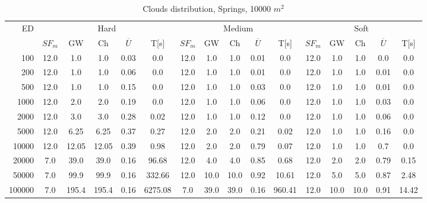 \begin{table}[htb]
	\centering
	\footnotesize
	\begin{tabular}{|r|c|c|c|c|c|c|c|c|c|c|c|c|c|c|c|} 
		\hline
		\multirow{2}{*}{ED} & \multicolumn{5}{c|}{Hard} & \multicolumn{5}{c|}{Medium} &\multicolumn{5}{c|}{Soft} \\ 
		\cline{2-16} 
		&$SF_{m}$&GW & Ch & $\overline{U}$&T[s] &$SF_{m}$&GW & Ch & $\overline{U}$ &T[s] &$SF_{m}$&GW & Ch & $\overline{U}$  & T[s]  \\ 
		\hline 
		100 & 12.0 & 1.0 & 1.0 & 0.03 & 0.0 & 12.0 & 1.0 & 1.0 & 0.01 & 0.0 & 12.0 & 1.0 & 1.0 & 0.0 & 0.0\\ 
		200 & 12.0 & 1.0 & 1.0 & 0.06 & 0.0 & 12.0 & 1.0 & 1.0 & 0.01 & 0.0 & 12.0 & 1.0 & 1.0 & 0.01 & 0.0\\ 
		500 & 12.0 & 1.0 & 1.0 & 0.15 & 0.0 & 12.0 & 1.0 & 1.0 & 0.03 & 0.0 & 12.0 & 1.0 & 1.0 & 0.01 & 0.0\\ 
		1000 & 12.0 & 2.0 & 2.0 & 0.19 & 0.0 & 12.0 & 1.0 & 1.0 & 0.06 & 0.0 & 12.0 & 1.0 & 1.0 & 0.03 & 0.0\\ 
		2000 & 12.0 & 3.0 & 3.0 & 0.28 & 0.02 & 12.0 & 1.0 & 1.0 & 0.12 & 0.0 & 12.0 & 1.0 & 1.0 & 0.06 & 0.0\\ 
		5000 & 12.0 & 6.25 & 6.25 & 0.37 & 0.27 & 12.0 & 2.0 & 2.0 & 0.21 & 0.02 & 12.0 & 1.0 & 1.0 & 0.16 & 0.0\\ 
		10000 & 12.0 & 12.05 & 12.05 & 0.39 & 0.98 & 12.0 & 2.0 & 2.0 & 0.79 & 0.07 & 12.0 & 1.0 & 1.0 & 0.7 & 0.0\\ 
		20000 & 7.0 & 39.0 & 39.0 & 0.16 & 96.68 & 12.0 & 4.0 & 4.0 & 0.85 & 0.68 & 12.0 & 2.0 & 2.0 & 0.79 & 0.15\\ 
		50000 & 7.0 & 99.9 & 99.9 & 0.16 & 332.66 & 12.0 & 10.0 & 10.0 & 0.92 & 10.61 & 12.0 & 5.0 & 5.0 & 0.87 & 2.48\\ 
		100000 & 7.0 & 195.4 & 195.4 & 0.16 & 6275.08 & 7.0 & 39.0 & 39.0 & 0.16 & 960.41 & 12.0 & 10.0 & 10.0 & 0.91 & 14.42\\ 
		\hline 
	\end{tabular} 
	\caption{Clouds distribution, Springs, 10000 $m^2$} 
	\label{tab:UnSprings100} 
\end{table} 
